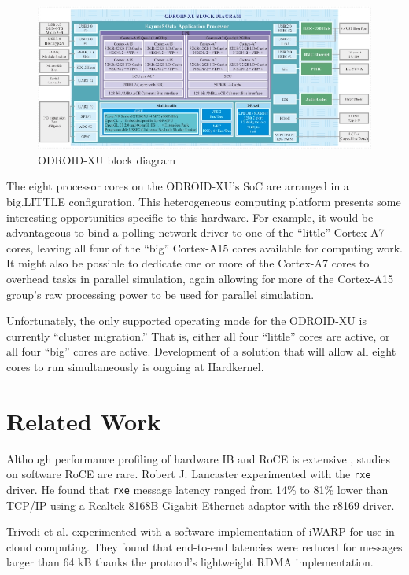 \documentclass[11pt]{book}
\begin{document}
\begin{figure}[h]
\centering
\includegraphics[width=\textwidth]{odroid_xu_block_diagram}
\caption{ODROID-XU block diagram \cite{odroid-xu-board-detail}}
\label{odroid-xu-block-diagram}
\end{figure}


The eight processor cores on the ODROID-XU's SoC are arranged in a big.LITTLE
configuration. This heterogeneous computing platform presents some interesting
opportunities specific to this hardware. For example, it would be advantageous
to bind a polling network driver to one of the ``little'' Cortex-A7 cores, leaving all four
of the ``big'' Cortex-A15 cores available for computing work. It might also be possible
to dedicate one or more of the Cortex-A7 cores to overhead tasks in parallel
simulation, again allowing for more of the Cortex-A15 group's raw processing
power to be used for parallel simulation.

Unfortunately, the only supported operating mode for the ODROID-XU is currently
``cluster migration.'' That is, either all four ``little'' cores are active, or
all four ``big'' cores are active. Development of a solution that will allow all
eight cores to run simultaneously is ongoing at Hardkernel.

\section{\textbf{Related Work}}



Although performance profiling of hardware IB and RoCE is extensive
\cite{subamaroni-09} \cite{vienne-12}, studies on software RoCE are
rare. Robert J. Lancaster \cite{lancaster-10} experimented with the \verb;rxe;
driver. He found that \verb;rxe; message latency ranged from 14\% to 81\% lower
than TCP/IP using a Realtek 8168B Gigabit Ethernet adaptor with the r8169
driver.

Trivedi et al. \cite{trivedi-11} experimented with a software implementation of
iWARP for use in cloud computing. They found that end-to-end latencies were
reduced for messages larger than 64 kB thanks the protocol's lightweight RDMA
implementation.
\end{document}

